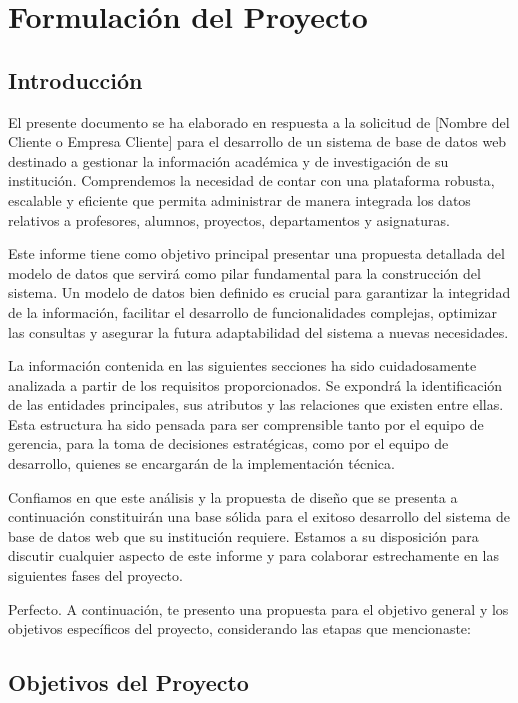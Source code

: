 
\chapter{Formulación del Proyecto}

\section{Introducción}

El presente documento se ha elaborado en respuesta a la solicitud de [Nombre del Cliente o Empresa Cliente] para el desarrollo de un sistema de base de datos web destinado a gestionar la información académica y de investigación de su institución. Comprendemos la necesidad de contar con una plataforma robusta, escalable y eficiente que permita administrar de manera integrada los datos relativos a profesores, alumnos, proyectos, departamentos y asignaturas.

Este informe tiene como objetivo principal presentar una propuesta detallada del modelo de datos que servirá como pilar fundamental para la construcción del sistema. Un modelo de datos bien definido es crucial para garantizar la integridad de la información, facilitar el desarrollo de funcionalidades complejas, optimizar las consultas y asegurar la futura adaptabilidad del sistema a nuevas necesidades.

La información contenida en las siguientes secciones ha sido cuidadosamente analizada a partir de los requisitos proporcionados. Se expondrá la identificación de las entidades principales, sus atributos y las relaciones que existen entre ellas. Esta estructura ha sido pensada para ser comprensible tanto por el equipo de gerencia, para la toma de decisiones estratégicas, como por el equipo de desarrollo, quienes se encargarán de la implementación técnica.

Confiamos en que este análisis y la propuesta de diseño que se presenta a continuación constituirán una base sólida para el exitoso desarrollo del sistema de base de datos web que su institución requiere. Estamos a su disposición para discutir cualquier aspecto de este informe y para colaborar estrechamente en las siguientes fases del proyecto.

Perfecto. A continuación, te presento una propuesta para el objetivo general y los objetivos específicos del proyecto, considerando las etapas que mencionaste:

\section{Objetivos del Proyecto}


